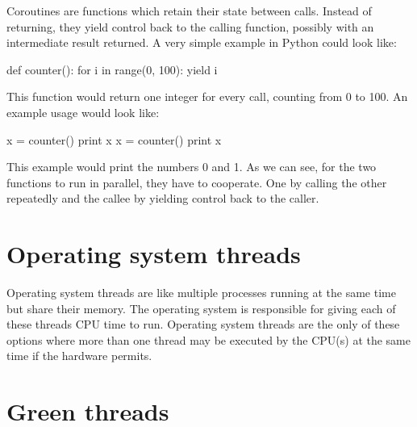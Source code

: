 \documentclass[bachelor,english]{hgbthesis}
\begin{document}
Coroutines are functions which retain their state between calls. Instead of returning, they yield control back to the calling function, possibly with an intermediate result returned. A very simple example in Python could look like:
\begin{GenericCode}
def counter():
    for i in range(0, 100):
	yield i
\end{GenericCode}
This function would return one integer for every call, counting from 0 to 100. An example usage would look like:
\begin{GenericCode}
x = counter()
print x
x = counter()
print x
\end{GenericCode}
This example would print the numbers 0 and 1. As we can see, for the two functions to run in parallel, they have to cooperate. One by calling the other repeatedly and the callee by yielding control back to the caller.

\section{Operating system threads}

Operating system threads are like multiple processes running at the same time but share their memory. The operating system is responsible for giving each of these threads CPU time to run. Operating system threads are the only of these options where more than one thread may be executed by the CPU(s) at the same time if the hardware permits.

\section {Green threads}
\end{document}
